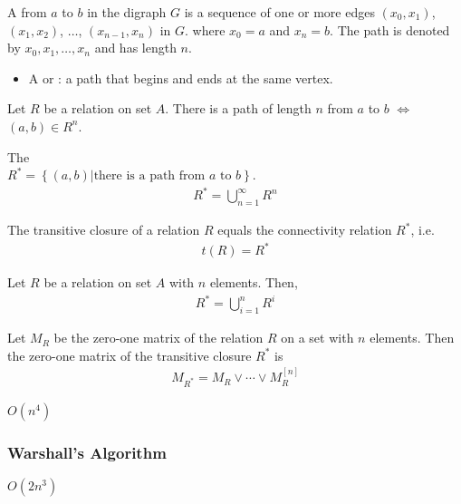 \begin{definition}
    A  from $a$ to $b$ in the digraph $G$ is a sequence of one or more edges $(x_0,x_1)$, $(x_1,x_2)$, $\dots$, $(x_{n-1},x_n)$ in $G$. where $x_0=a$ and $x_n=b$. The path is denoted by $x_0,x_1,\dots,x_n$ and has length $n$. 
    \begin{itemize}
        \item A  or : a path that begins and ends at the same vertex. 
    \end{itemize}
\end{definition}

\begin{theorem}
    Let $R$ be a relation on set $A$. There is a path of length $n$ from $a$ to $b$ $\Leftrightarrow$ $(a,b)\in R^n$.
\end{theorem}

\begin{definition}
    The \\ $R^*=\left\{ (a,b)| \text{there is a path from $a$ to $b$} \right\}$. 
    \begin{align*}
        R^*=\bigcup_{n=1}^{\infty}R^n
    \end{align*}
\end{definition}

\begin{theorem}
    The transitive closure of a relation $R$ equals the connectivity relation $R^*$, i.e.
    \begin{align*}
        t(R)=R^*
    \end{align*}
\end{theorem}

Let $R$ be a relation on set $A$ with $n$ elements. Then,
\begin{align*}
    R^*=\bigcup_{i=1}^n R^i
\end{align*}

\begin{theorem}
    Let $M_R$ be the zero-one matrix of the relation $R$ on a set with $n$ elements. Then the zero-one matrix of the transitive closure $R^*$ is 
    \begin{align*}
        M_{R^*}=M_R\lor \cdots \lor M_R^{[n]}
    \end{align*}
\end{theorem}

$O(n^4)$

\subsubsection{Warshall's Algorithm}
$O(2n^3)$

